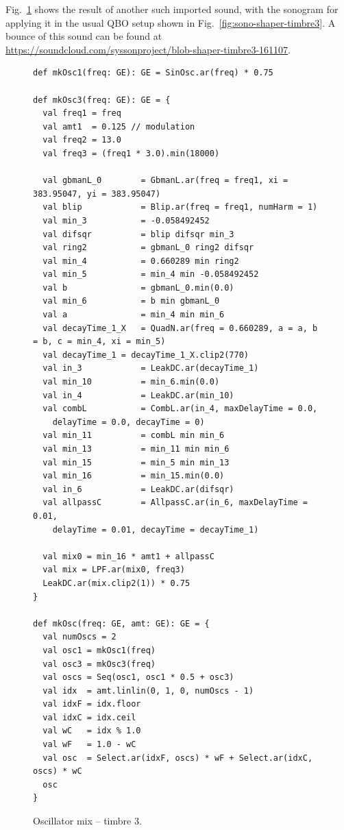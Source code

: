 \documentclass[11pt,a4paper]{article}
\newcommand{\figref}[1]{Fig.~\ref{#1}}
\begin{document}
\figref{fig:code-shaper-timbre3} shows the result of another such imported sound, with the sonogram for applying it in the usual QBO setup shown in \figref{fig:sono-shaper-timbre3}. A bounce of this sound can be found at \url{https://soundcloud.com/syssonproject/blob-shaper-timbre3-161107}.

\begin{figure}[b]
\begin{lstlisting}[style=scala]
def mkOsc1(freq: GE): GE = SinOsc.ar(freq) * 0.75

def mkOsc3(freq: GE): GE = {
  val freq1 = freq
  val amt1  = 0.125 // modulation
  val freq2 = 13.0
  val freq3 = (freq1 * 3.0).min(18000)
  
  val gbmanL_0        = GbmanL.ar(freq = freq1, xi = 383.95047, yi = 383.95047)
  val blip            = Blip.ar(freq = freq1, numHarm = 1)
  val min_3           = -0.058492452
  val difsqr          = blip difsqr min_3
  val ring2           = gbmanL_0 ring2 difsqr
  val min_4           = 0.660289 min ring2
  val min_5           = min_4 min -0.058492452
  val b               = gbmanL_0.min(0.0)
  val min_6           = b min gbmanL_0
  val a               = min_4 min min_6
  val decayTime_1_X   = QuadN.ar(freq = 0.660289, a = a, b = b, c = min_4, xi = min_5)
  val decayTime_1 = decayTime_1_X.clip2(770)
  val in_3            = LeakDC.ar(decayTime_1)
  val min_10          = min_6.min(0.0)
  val in_4            = LeakDC.ar(min_10)
  val combL           = CombL.ar(in_4, maxDelayTime = 0.0, 
    delayTime = 0.0, decayTime = 0)
  val min_11          = combL min min_6
  val min_13          = min_11 min min_6
  val min_15          = min_5 min min_13
  val min_16          = min_15.min(0.0)
  val in_6            = LeakDC.ar(difsqr)
  val allpassC        = AllpassC.ar(in_6, maxDelayTime = 0.01,
    delayTime = 0.01, decayTime = decayTime_1)
  
  val mix0 = min_16 * amt1 + allpassC
  val mix = LPF.ar(mix0, freq3)
  LeakDC.ar(mix.clip2(1)) * 0.75
}  

def mkOsc(freq: GE, amt: GE): GE = {
  val numOscs = 2
  val osc1 = mkOsc1(freq)
  val osc3 = mkOsc3(freq)
  val oscs = Seq(osc1, osc1 * 0.5 + osc3)
  val idx  = amt.linlin(0, 1, 0, numOscs - 1)
  val idxF = idx.floor
  val idxC = idx.ceil
  val wC   = idx % 1.0
  val wF   = 1.0 - wC
  val osc  = Select.ar(idxF, oscs) * wF + Select.ar(idxC, oscs) * wC
  osc
}
\end{lstlisting}
\caption{Oscillator mix -- timbre 3.}
\label{fig:code-shaper-timbre3}
\end{figure}
\end{document}
